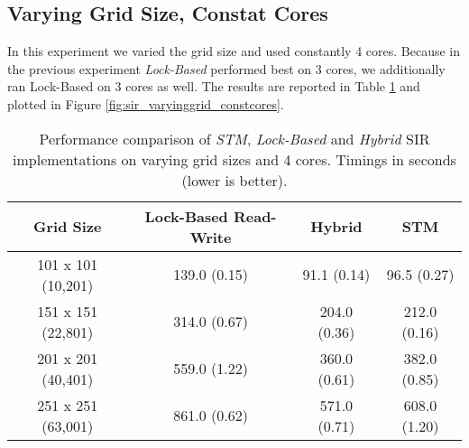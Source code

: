
\subsection{Varying Grid Size, Constat Cores}
In this experiment we varied the grid size and used constantly 4 cores. Because in the previous experiment \textit{Lock-Based} performed best on 3 cores, we additionally ran Lock-Based on 3 cores as well. %
The results are reported in Table \ref{tab:sir_varyinggrid_constcores} and plotted in Figure \ref{fig:sir_varyinggrid_constcores}.

\begin{table}
	\centering
  	\begin{tabular}{ c || c | c | c  }
        Grid Size          &  Lock-Based Read-Write & Hybrid       & STM            \\ \hline \hline 
   		101 x 101 (10,201) &  139.0 (0.15)          & 91.1 (0.14)  & 96.5 (0.27)    \\ \hline
   		151 x 151 (22,801) &  314.0 (0.67)          & 204.0 (0.36) & 212.0 (0.16)   \\ \hline
   		201 x 201 (40,401) &  559.0 (1.22)          & 360.0 (0.61) & 382.0 (0.85)   \\ \hline
   		251 x 251 (63,001) &  861.0 (0.62)          & 571.0 (0.71) & 608.0 (1.20)   \\ \hline \hline
  	\end{tabular}

  	\caption{Performance comparison of \textit{STM}, \textit{Lock-Based} and \textit{Hybrid} SIR implementations on varying grid sizes and 4 cores. Timings in seconds (lower is better).}
	\label{tab:sir_varyinggrid_constcores}
\end{table}


